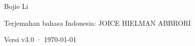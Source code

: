 \begin{titlepage}
\vfill
{\LARGE\sffamily Bojie Li\par}
\vspace{0.35cm}
{\small\sffamily Terjemahan bahasa Indonesia: JOICE HIELMAN ABBRORI\par}
\vspace{0.45cm}
{\small\sffamily\color{structurecolor!80} Versi v3.0 · \today\par}
\vspace{1.2cm}
\end{titlepage}
